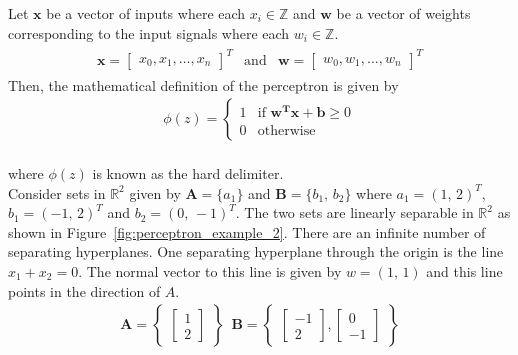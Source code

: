 \noindent Let $\textbf{x}$ be a vector of inputs where each $x_i \in \mathbb{Z}$ and $\textbf{w}$ be a vector of weights corresponding to the input signals where each $w_i \in \mathbb{Z}$. 
\begin{align}
  \begin{matrix}
    \textbf{x} = \begin{bmatrix}
      x_{0}, x_{1}, \dots, x_{n}
    \end{bmatrix}^T&\text{and} & \textbf{w} = \begin{bmatrix}
      w_{0}, w_{1}, \dots, w_{n}
    \end{bmatrix}^T
  \end{matrix} \nonumber
\end{align}
\noindent Then, the mathematical definition of the perceptron is given by
\begin{align}
  \phi(z) = \begin{cases}
    1 & \text{if } \mathbf{w^Tx + b}\geq  0\\
    0 & \text{otherwise}
    \label{eq:mcp_neuron}
  \end{cases}
\end{align}
\vspace{5mm}
\\
where $\phi(z)$ is known as the hard delimiter.
\vspace{5mm}
\\
\noindent Consider sets in $\mathbb{R}^2$ given by $\textbf{A}=\{a_1\}$ and $\textbf{B}=\{b_1,\,b_2\}$ where $a_1=(1,\,2)^T$, $b_1=(-1,\,2)^T$ and $b_2=(0,\,-1)^T$. The two sets are linearly separable in $\mathbb{R}^2$ as shown in Figure~\ref{fig:perceptron_example_2}. There are an infinite number of separating hyperplanes. One separating hyperplane through the origin is the line $x_1+x_2=0$. The normal vector to this line is given by $w=\left(1,\,1\right)$ and this line points in the direction of $A$. 
\begin{align}
  \textbf{A} =
  \begin{Bmatrix}
    \begin{bmatrix}
      1 \\ 
      2
    \end{bmatrix}
  \end{Bmatrix}
   \, \, \, 
  \textbf{B} =
\begin{Bmatrix}
  \begin{bmatrix}
    -1 \\
    2
  \end{bmatrix},
  \begin{bmatrix}
    0 \\
    -1
  \end{bmatrix}
  \end{Bmatrix}
\end{align}
